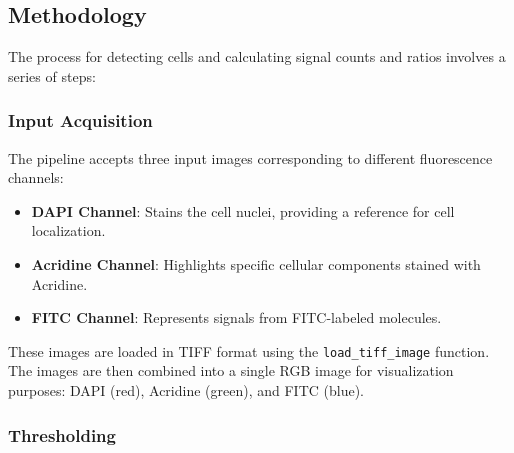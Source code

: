 \documentclass[a4paper,12pt]{article}
\begin{document}

\subsection{Methodology}

The process for detecting cells and calculating signal counts and ratios involves a series of steps:

\subsubsection{Input Acquisition}

The pipeline accepts three input images corresponding to different fluorescence channels:
\begin{itemize}
    \item \textbf{DAPI Channel}: Stains the cell nuclei, providing a reference for cell localization.
    \item \textbf{Acridine Channel}: Highlights specific cellular components stained with Acridine.
    \item \textbf{FITC Channel}: Represents signals from FITC-labeled molecules.
\end{itemize}
These images are loaded in TIFF format using the \texttt{load\_tiff\_image} function. The images are then combined into a single RGB image for visualization purposes: DAPI (red), Acridine (green), and FITC (blue).

\subsubsection{Thresholding}

\end{document}
